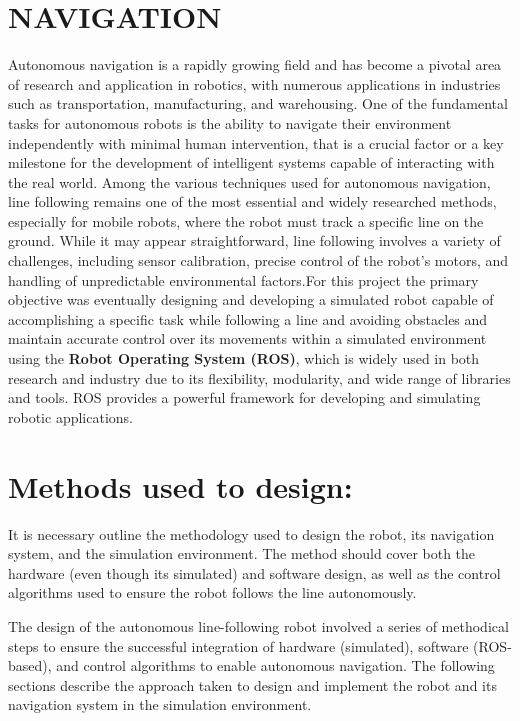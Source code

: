 \documentclass[../../main]{subfiles}
\begin{document}
\section{NAVIGATION}
    Autonomous navigation is a rapidly growing field and has become a
    pivotal area of research and application in robotics, with numerous
    applications in industries such as transportation, manufacturing, and
    warehousing. One of the fundamental tasks for autonomous robots is the
    ability to navigate their environment independently with minimal human
    intervention, that is a crucial factor or a key milestone for the
    development of intelligent systems capable of interacting with the real
    world. Among the various techniques used for autonomous navigation, line
    following remains one of the most essential and widely researched
    methods, especially for mobile robots, where the robot must track a
    specific line on the ground. While it may appear straightforward, line
    following involves a variety of challenges, including sensor
    calibration, precise control of the robot's motors, and handling of
    unpredictable environmental factors.For this project the primary
    objective was eventually designing and developing a simulated robot
    capable of accomplishing a specific task while following a line and
    avoiding obstacles and maintain accurate control over its movements
    within a simulated environment using the \textbf{Robot Operating System
    (ROS)}, which is widely used in both research and industry due to its
    flexibility, modularity, and wide range of libraries and tools. ROS
    provides a powerful framework for developing and simulating robotic
    applications.
    
    
    \section*{Methods used to design:}

    
    It is necessary outline the methodology used to design the robot, its
    navigation system, and the simulation environment. The method should
    cover both the hardware (even though it\textquotesingle s simulated) and
    software design, as well as the control algorithms used to ensure the
    robot follows the line autonomously.
    
    The design of the autonomous line-following robot involved a series of
    methodical steps to ensure the successful integration of hardware
    (simulated), software (ROS-based), and control algorithms to enable
    autonomous navigation. The following sections describe the approach
    taken to design and implement the robot and its navigation system in the
    simulation environment.
    
\end{document}
